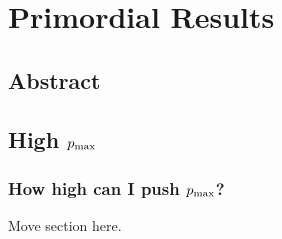 %
\chapter{Primordial Results}
\section{Abstract}\label{sec:primordial_abstract}
\section{High $p_\text{max}$}\label{sec:high_pmax}
\subsection{How high can I push $p_\text{max}$?}
Move section here.

